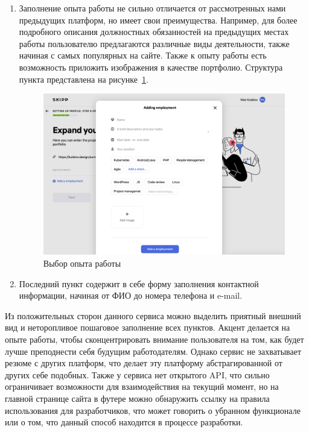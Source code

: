 \documentclass[master, och, diploma]{SCWorks}
\begin{document}
\begin{enumerate}
    \item Заполнение опыта работы не сильно отличается от рассмотренных нами предыдущих платформ, но имеет свои преимущества. Например, для более подробного описания должностных обязанностей на предыдущих местах работы пользователю предлагаются различные виды деятельности, также начиная с самых популярных на сайте. Также к опыту работы есть возможность приложить изображения в качестве портфолио. Структура пункта представлена на рисунке~\ref{fig:11}.
    \begin{figure}[!ht]
        \centering
        \includegraphics[width=12cm]{images/image17.png}
        \caption{\label{fig:11}%
            Выбор опыта работы}
    \end{figure}

    \item Последний пункт содержит в себе форму заполнения контактной информации, начиная от ФИО до номера телефона и e-mail. 
\end{enumerate}

Из положительных сторон данного сервиса можно выделить приятный внешний вид и неторопливое пошаговое заполнение всех пунктов. Акцент делается на опыте работы, чтобы сконцентрировать внимание пользователя на том, как будет лучше преподнести себя будущим работодателям. Однако сервис не захватывает резюме с других платформ, что делает эту платформу абстрагированной от других себе подобных. Также у сервиса нет открытого API, что сильно ограничивает возможности для взаимодействия на текущий момент, но на главной странице сайта в футере можно обнаружить ссылку на правила использования для разработчиков, что может говорить о убранном функционале или о том, что данный способ находится в процессе разработки.
\end{document}
